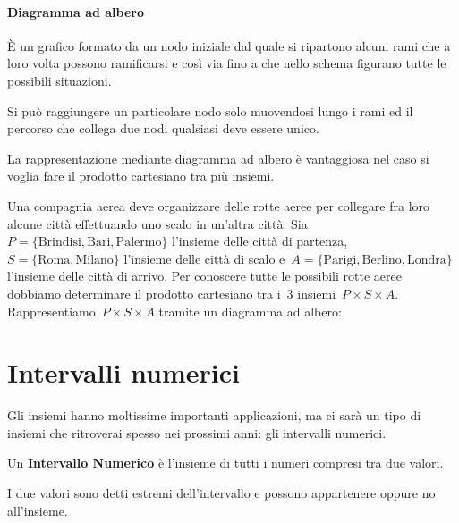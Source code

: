 {\begin{minipage}{.39 \textwidth}
\paragraph{Diagramma ad albero}
È un grafico formato da un nodo iniziale dal quale si ripartono alcuni
rami che a loro volta possono ramificarsi e così via fino a che nello
schema figurano tutte le possibili situazioni.

Si può raggiungere un particolare nodo solo muovendosi lungo i rami ed
il percorso che collega due nodi qualsiasi deve essere unico.

La rappresentazione mediante diagramma ad albero è vantaggiosa nel
caso si voglia fare il prodotto cartesiano tra più insiemi.
\end{minipage}

\begin{exrig}
 \begin{esempio}
 Una compagnia aerea deve organizzare delle rotte aeree per collegare fra 
 loro alcune città effettuando uno scalo in un'altra città. 
 Sia~\(P=\{\text{Brindisi},\text{Bari},\text{Palermo}\}\) l'insieme delle 
città 
 di partenza, \(S=\{\text{Roma},\text{Milano}\}\) l'insieme delle città di
 scalo e~\(A=\{\text{Parigi},\text{Berlino},\text{Londra}\}\) l'insieme 
delle 
 città di arrivo. Per conoscere tutte le possibili rotte aeree dobbiamo
determinare il prodotto cartesiano tra i~3 insiemi~\(P\times S\times A\).
Rappresentiamo~\(P\times S\times A\) tramite un diagramma ad albero:

\begin{center}

\end{center}
 \end{esempio}
\end{exrig}

\section{Intervalli numerici}
\label{sec:insiemi_intervalli}

Gli insiemi hanno moltissime importanti applicazioni, ma ci sarà un tipo di 
insiemi che ritroverai spesso nei prossimi anni: gli intervalli numerici.

\begin{definizione}
Un \textbf{Intervallo Numerico} è l'insieme di tutti i numeri compresi tra 
due valori.

I due valori sono detti estremi dell'intervallo e possono appartenere 
oppure no all'insieme.
\end{definizione}

}
